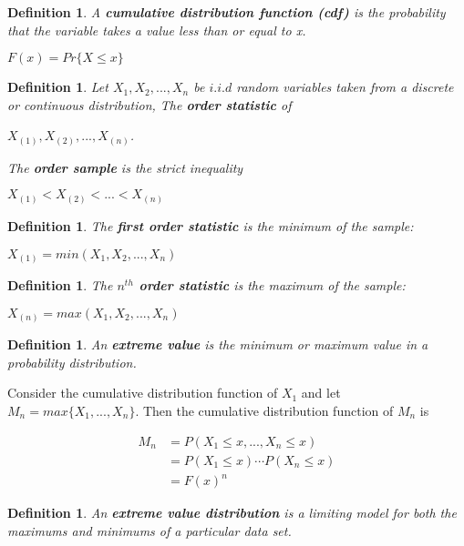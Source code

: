 \documentclass[11pt,a4paper]{article}
\theoremstyle{plain}
\newtheorem{de}[fact]{Definition}
\begin{document}
\begin{de}
A \textbf{cumulative distribution function (cdf)} is the probability that the variable takes a value less than or equal to x.
\begin{center}
$F(x)=Pr\{X \leq x\}$ 
\end{center}
\end{de}

\begin{de}
Let $X_1,X_2,...,X_n$ be $i.i.d$ random variables taken from a discrete or continuous distribution, 
The \textbf{order statistic} of
\begin{center}
 $X_{(1)},X_{(2)},...,X_{(n)}$.
\end{center}
The \textbf{order sample} is the strict inequality
\begin{center}
$X_{(1)}<X_{(2)}<...<X_{(n)}$
\end{center}
\end{de}

\begin{de}
 The \textbf{first order statistic} is the minimum of the sample: 
\begin{center}
$X_{(1)}=min(X_1,X_2,...,X_n)$
\end{center}
\end{de}

\begin{de}
The \textbf{$n^{th}$ order statistic} is the maximum of the sample:
\begin{center}
$X_{(n)}=max(X_1,X_2,...,X_n)$
\end{center}
\end{de}

\begin{de}
An \textbf{extreme value} is the minimum or maximum value in a probability distribution.
\end{de}
Consider the cumulative distribution function of $X_1$ and let $M_n=max\{X_1,...,X_n\}$. Then the cumulative distribution function of $M_n$ is 


\begin{equation*}
\begin{split}
M_n &= P(X_1 \leq x,...,X_n \leq x)\\
  &=P(X_1 \leq x)\cdots P(X_n \leq x)\\
  &= F(x)^n
  \end{split}
  \end{equation*}

\begin{de}
An \textbf{extreme value distribution} is a limiting model for both the maximums and minimums of a particular data set. 
\end{de}
\end{document}
